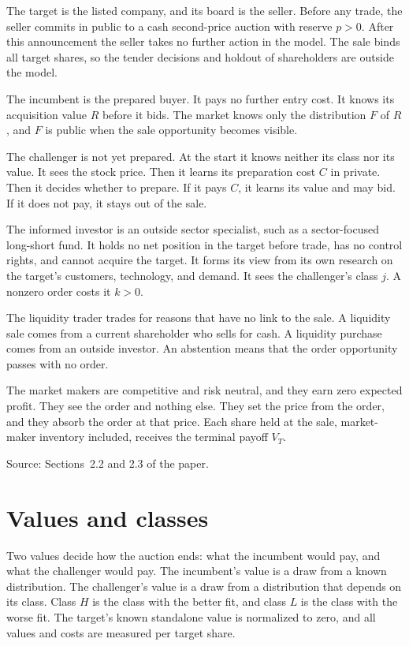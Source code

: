 The target is the listed company, and its board is the seller.
Before any trade, the seller commits in public to a cash second-price auction with reserve \(p>0\).
After this announcement the seller takes no further action in the model.
The sale binds all target shares, so the tender decisions and holdout of shareholders are outside the model.

The incumbent is the prepared buyer. It pays no further entry cost.
It knows its acquisition value \(R\) before it bids.
The market knows only the distribution \(F\) of \(R\), and \(F\) is public when the sale opportunity becomes visible.

The challenger is not yet prepared. At the start it knows neither its class nor its value.
It sees the stock price. Then it learns its preparation cost \(C\) in private.
Then it decides whether to prepare. If it pays \(C\), it learns its value and may bid. If it does not pay, it stays out of the sale.

The informed investor is an outside sector specialist, such as a sector-focused long-short fund.
It holds no net position in the target before trade, has no control rights, and cannot acquire the target.
It forms its view from its own research on the target's customers, technology, and demand.
It sees the challenger's class \(j\). A nonzero order costs it \(k>0\).

The liquidity trader trades for reasons that have no link to the sale.
A liquidity sale comes from a current shareholder who sells for cash. A liquidity purchase comes from an outside investor.
An abstention means that the order opportunity passes with no order.

The market makers are competitive and risk neutral, and they earn zero expected profit.
They see the order and nothing else.
They set the price from the order, and they absorb the order at that price.
Each share held at the sale, market-maker inventory included, receives the terminal payoff \(V_T\).

{\small\color{notegrey}Source: Sections~2.2 and 2.3 of the paper.}

\section{Values and classes}\label{sec:model-values}

Two values decide how the auction ends: what the incumbent would pay, and what the challenger would pay.
The incumbent's value is a draw from a known distribution.
The challenger's value is a draw from a distribution that depends on its class.
Class \(H\) is the class with the better fit, and class \(L\) is the class with the worse fit.
The target's known standalone value is normalized to zero, and all values and costs are measured per target share.

